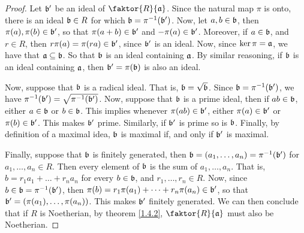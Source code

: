  \begin{proof}
     Let $\bf'$ be an ideal of $\faktor{R}{\af}$. Since the natural map $\pi$ is
     onto, there is an ideal $\bf \in R$ for which $\bf=\inv{\pi}(\bf')$. Now,
     let $a,b \in \bf$, then $\pi(a),\pi(b) \in \bf'$, so that $\pi(a+b) \in
     \bf'$ and $-\pi(a) \in \bf'$. Moreover, if $a \in \bf$, and $r \in R$, then
     $r\pi(a)=\pi(ra) \in \bf'$, since $\bf'$ is an ideal. Now, since
     $\ker{\pi}=\af$, we have that $\af \subseteq \bf$. So that $\bf$ is an
     ideal containing $\af$. By similar reasoning, if $\bf$ is an ideal
     containing $\af$, then $\bf'=\pi(\bf)$ is also an ideal.

     Now, suppose that $\bf$ is a radical ideal. That is, $\bf=\sqrt{\bf}$. Since
     $\bf=\inv{\pi}(\bf')$, we have $\inv{\pi}(\bf')=\sqrt{\inv{\pi}(\bf')}$.
     Now, suppose that $\bf$ is a prime ideal, then if $ab \in \bf$, either $a
     \in \bf$ or $b \in \bf$. This implies whenever $\pi(ab) \in \bf'$, either
     $\pi(a) \in \bf'$ or $\pi(b) \in \bf'$. This makes $\bf'$ prime. Similarly,
     if $\bf'$ is prime so is $\bf$. Finally, by definition of a maximal idea,
     $\bf$ is maximal if, and only if $\bf'$ is maximal.

     Finally, suppose that $\bf$ is finitely generated, then $\bf=(a_1, \dots,
     a_n)=\inv{\pi}(\bf')$ for $a_1, \dots, a_n \in R$. Then every element of
     $\bf$ is the sum of $a_1, \dots, a_n$. That is, $b=r_1a_1+\dots+r_na_n$ for
     every $b \in \bf$, and $r_1, \dots, r_n \in R$. Now, since $b \in
     \bf=\inv{\pi}(\bf')$, then $\pi(b)=r_1\pi(a_1)+\dots+r_n\pi(a_n) \in \bf'$,
     so that $\bf'=(\pi(a_1), \dots, \pi(a_n))$. This makes $\bf'$ finitely
     generated. We can then conclude that if $R$ is Noetherian, by theorem
     \ref{1.4.2}, $\faktor{R}{\af}$ must also be Noetherian.
 \end{proof}
